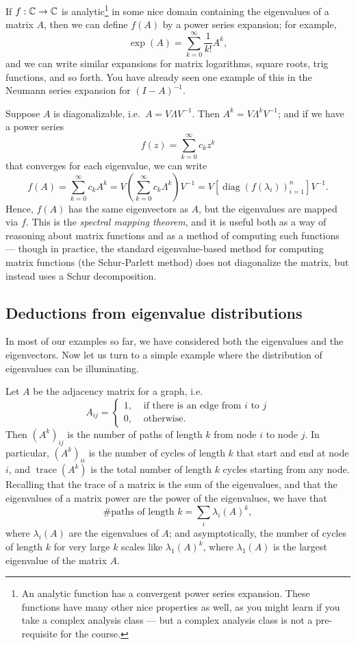 \documentclass[12pt, leqno]{article}
\begin{document}
If $f : \mathbb{C} \rightarrow \mathbb{C}$ is analytic\footnote{%
An analytic function has a convergent power series expansion.  These
functions have many other nice properties as well, as you might learn
if you take a complex analysis class --- but a complex
analysis class is not a pre-requisite for the course.}
in some nice domain containing the eigenvalues of a matrix $A$, then
we can define $f(A)$ by a power series expansion; for example,
\[
  \exp(A) = \sum_{k=0}^\infty \frac{1}{k!} A^k,
\]
and we can write similar expansions for matrix logarithms, square roots,
trig functions, and so forth.  You have already seen one example of this
in the Neumann series expansion for $(I-A)^{-1}$.

Suppose $A$ is diagonalizable, i.e.~$A = V \Lambda V^{-1}$.  Then
$A^k = V \Lambda^k V^{-1}$; and if we have a power series
\[
  f(z) = \sum_{k=0}^\infty c_k z^k
\]
that converges for each eigenvalue, we can write
\[
  f(A) = \sum_{k=0}^\infty c_k A^k
       = V \left( \sum_{k=0}^\infty c_k \Lambda^k \right) V^{-1}
       = V \left[ \operatorname{diag}(f(\lambda_i))_{i=1}^n \right] V^{-1}.
\]
Hence, $f(A)$ has the same eigenvectors as $A$, but the eigenvalues
are mapped via $f$.  This is the {\em spectral mapping theorem}, and it
is useful both as a way of reasoning about matrix functions and as a
method of computing such functions --- though in practice, the standard
eigenvalue-based method for computing matrix functions
(the Schur-Parlett method) does not diagonalize the matrix, but instead
uses a Schur decomposition.

\subsection{Deductions from eigenvalue distributions}

In most of our examples so far, we have considered both the
eigenvalues and the eigenvectors.  Now let us turn to a simple example
where the distribution of eigenvalues can be illuminating.

Let $A$ be the adjacency matrix for a graph, i.e.
\[
  A_{ij} = \begin{cases}
    1, & \mbox{ if there is an edge from $i$ to $j$} \\
    0, & \mbox{ otherwise}.
  \end{cases}
\]
Then $(A^k)_{ij}$ is the number of paths of length $k$ from node $i$
to node $j$.  In particular, $(A^k)_{ii}$ is the number of cycles of
length $k$ that start and end at node $i$, and
$\operatorname{trace}(A^k)$ is the total number of length $k$ cycles
starting from any node.  Recalling that the trace of a matrix is the
sum of the eigenvalues, and that the eigenvalues of a matrix power are
the power of the eigenvalues, we have that
\[
  \mbox{\# paths of length $k$} = \sum_{i} \lambda_i(A)^k,
\]
where $\lambda_i(A)$ are the eigenvalues of $A$; and asymptotically,
the number of cycles of length $k$ for very large $k$ scales like
$\lambda_1(A)^k$, where $\lambda_1(A)$ is the largest eigenvalue of
the matrix $A$.
\end{document}

